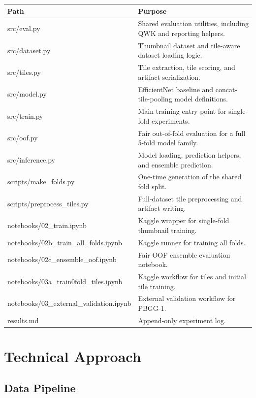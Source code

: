 \documentclass[11pt]{article}
\begin{document}
\begin{table}[h]
\centering
\begin{tabularx}{\textwidth}{>{\ttfamily}l X}
\toprule
Path & Purpose \\
\midrule
src/eval.py & Shared evaluation utilities, including QWK and reporting helpers. \\
src/dataset.py & Thumbnail dataset and tile-aware dataset loading logic. \\
src/tiles.py & Tile extraction, tile scoring, and artifact serialization. \\
src/model.py & EfficientNet baseline and concat-tile-pooling model definitions. \\
src/train.py & Main training entry point for single-fold experiments. \\
src/oof.py & Fair out-of-fold evaluation for a full 5-fold model family. \\
src/inference.py & Model loading, prediction helpers, and ensemble prediction. \\
scripts/make_folds.py & One-time generation of the shared fold split. \\
scripts/preprocess_tiles.py & Full-dataset tile preprocessing and artifact writing. \\
notebooks/02\_train.ipynb & Kaggle wrapper for single-fold thumbnail training. \\
notebooks/02b\_train\_all\_folds.ipynb & Kaggle runner for training all folds. \\
notebooks/02c\_ensemble\_oof.ipynb & Fair OOF ensemble evaluation notebook. \\
notebooks/03a\_train0fold\_tiles.ipynb & Kaggle workflow for tiles and initial tile training. \\
notebooks/03\_external\_validation.ipynb & External validation workflow for PBGG-1. \\
results.md & Append-only experiment log. \\
\bottomrule
\end{tabularx}
\end{table}

\section{Technical Approach}

\subsection{Data Pipeline}
\end{document}
